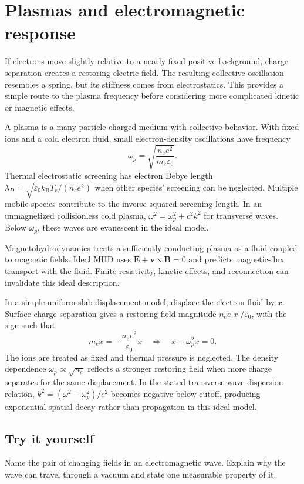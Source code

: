 \documentclass[11pt,oneside]{book}
\newcommand{\vect}[1]{\boldsymbol{#1}}
\newcommand{\kb}{k_{\mathrm B}}
\newcommand{\eps}{\varepsilon_0}
\theoremstyle{reviewstyle}
\newcommand{\learningcheck}[1]{\subsection*{Try it yourself}\noindent #1\par}
\begin{document}
\section{Plasmas and electromagnetic response}
If electrons move slightly relative to a nearly fixed positive background, charge separation creates a restoring electric field. The resulting collective oscillation resembles a spring, but its stiffness comes from electrostatics. This provides a simple route to the plasma frequency before considering more complicated kinetic or magnetic effects.

A plasma is a many-particle charged medium with collective behavior. With fixed ions and a cold electron fluid, small electron-density oscillations have frequency
\begin{equation}\omega_p=\sqrt{\frac{n_ee^2}{m_e\eps}}.\end{equation}
Thermal electrostatic screening has electron Debye length
$\lambda_D=\sqrt{\eps\kb T_e/(n_ee^2)}$ when other species' screening can be neglected. Multiple mobile species contribute to the inverse squared screening length. In an unmagnetized collisionless cold plasma,
$\omega^2=\omega_p^2+c^2k^2$ for transverse waves. Below $\omega_p$, these waves are evanescent in the ideal model.

Magnetohydrodynamics treats a sufficiently conducting plasma as a fluid coupled to magnetic fields. Ideal MHD uses $\vect E+\vect v\times\vect B=0$ and predicts magnetic-flux transport with the fluid. Finite resistivity, kinetic effects, and reconnection can invalidate this ideal description.

In a simple uniform slab displacement model, displace the electron fluid by $x$. Surface charge separation gives a restoring-field magnitude $n_ee|x|/\eps$, with the sign such that
\begin{equation}
m_e\ddot x=-\frac{n_ee^2}{\eps}x
\quad\Longrightarrow\quad \ddot x+\omega_p^2x=0.
\end{equation}
The ions are treated as fixed and thermal pressure is neglected. The density dependence $\omega_p\propto\sqrt{n_e}$ reflects a stronger restoring field when more charge separates for the same displacement. In the stated transverse-wave dispersion relation, $k^2=(\omega^2-\omega_p^2)/c^2$ becomes negative below cutoff, producing exponential spatial decay rather than propagation in this ideal model.

\learningcheck{Name the pair of changing fields in an electromagnetic wave. Explain why the wave can travel through a vacuum and state one measurable property of it.}
\end{document}
